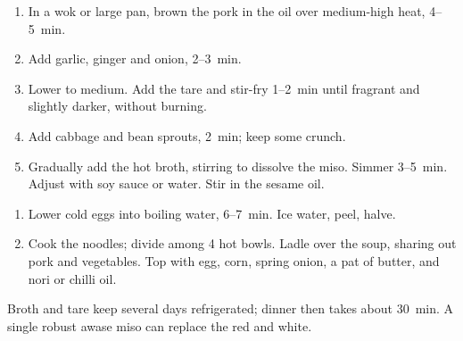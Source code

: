 
\begin{ingredients}
\end{ingredients}

\begin{recipe}
  \begin{enumerate}

  \item In a wok or large pan, brown the pork in the oil over
    medium-high heat, 4--5~min.

  \item Add garlic, ginger and onion, 2--3~min.

  \item Lower to medium. Add the tare and stir-fry 1--2~min until
    fragrant and slightly darker, without burning.

  \item Add cabbage and bean sprouts, 2~min; keep some crunch.

  \item Gradually add the hot broth, stirring to dissolve the miso.
    Simmer 3--5~min. Adjust with soy sauce or water. Stir in the
    sesame oil.

  \end{enumerate}
\end{recipe}



\begin{ingredients}
\end{ingredients}

\begin{recipe}
  \begin{enumerate}

  \item Lower cold eggs into boiling water, 6\fracH--7~min. Ice water,
    peel, halve.

  \item Cook the noodles; divide among 4 hot bowls. Ladle over the
    soup, sharing out pork and vegetables. Top with egg, corn, spring
    onion, a pat of butter, and nori or chilli oil.

  \end{enumerate}
\end{recipe}

\notes Broth and tare keep several days refrigerated; dinner then
takes about 30~min. A single robust awase miso can replace the red
and white.

